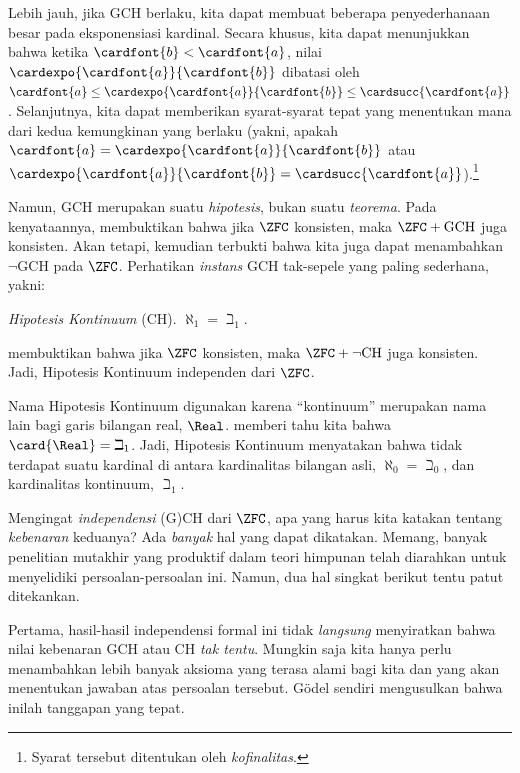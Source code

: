 \documentclass[../../../include/open-logic-section]{subfiles}
\begin{document}
Lebih jauh, jika GCH berlaku, kita dapat membuat beberapa penyederhanaan
besar pada eksponensiasi kardinal. Secara khusus, kita dapat menunjukkan bahwa
ketika $\cardfont{b} < \cardfont{a}$, nilai
$\cardexpo{\cardfont{a}}{\cardfont{b}}$ dibatasi oleh
$\cardfont{a}\leq \cardexpo{\cardfont{a}}{\cardfont{b}} \leq
\cardsucc{\cardfont{a}}$. Selanjutnya, kita dapat memberikan syarat-syarat
tepat yang menentukan mana dari kedua kemungkinan yang berlaku (yakni,
apakah $\cardfont{a} = \cardexpo{\cardfont{a}}{\cardfont{b}}$ atau
$\cardexpo{\cardfont{a}}{\cardfont{b}} =
\cardsucc{\cardfont{a}}$).\footnote{Syarat tersebut ditentukan oleh
\emph{kofinalitas}.}

Namun, GCH merupakan suatu \emph{hipotesis}, bukan suatu \emph{teorema}.
Pada kenyataannya, \citet{Godel1938} membuktikan bahwa jika $\ZFC$ konsisten,
maka $\ZFC + \text{GCH}$ juga konsisten. Akan tetapi, kemudian terbukti bahwa
kita juga dapat menambahkan $\lnot$GCH pada $\ZFC$. Perhatikan \emph{instans} GCH
tak-sepele yang paling sederhana, yakni:

\begin{defish}
\emph{Hipotesis Kontinuum} (CH). $\aleph_1 = \beth_1$.
\end{defish}

\citet{Cohen1963} membuktikan bahwa jika $\ZFC$ konsisten, maka
$\ZFC + \lnot\text{CH}$ juga konsisten. Jadi, Hipotesis Kontinuum independen
dari $\ZFC$.

Nama Hipotesis Kontinuum digunakan karena ``kontinuum'' merupakan nama lain
bagi garis bilangan real, $\Real$.
 memberi tahu kita bahwa
$\card{\Real} = \beth_1$. Jadi, Hipotesis Kontinuum menyatakan bahwa tidak
terdapat suatu kardinal di antara kardinalitas bilangan asli,
$\aleph_0 = \beth_0$, dan kardinalitas kontinuum, $\beth_1$.

Mengingat \emph{independensi} (G)CH dari $\ZFC$, apa yang harus kita katakan
tentang \emph{kebenaran} keduanya? Ada \emph{banyak} hal yang dapat dikatakan.
Memang, banyak penelitian mutakhir yang produktif dalam teori himpunan telah
diarahkan untuk menyelidiki persoalan-persoalan ini. Namun, dua hal singkat
berikut tentu patut ditekankan.

Pertama, hasil-hasil independensi formal ini tidak \emph{langsung}
menyiratkan bahwa nilai kebenaran GCH atau CH \emph{tak tentu}. Mungkin saja
kita hanya perlu menambahkan lebih banyak aksioma yang terasa alami bagi
kita dan yang akan menentukan jawaban atas persoalan tersebut. G\"odel sendiri
mengusulkan bahwa inilah tanggapan yang tepat.
\end{document}
